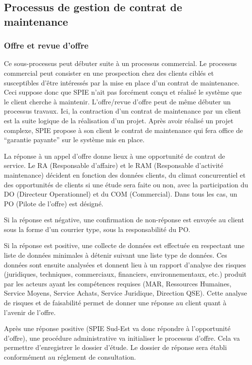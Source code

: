 \subsection{Processus de gestion de contrat de maintenance}

\subsubsection{Offre et revue d’offre}

Ce sous-processus peut débuter suite à un processus commercial. Le processus commercial peut consister en une prospection chez des clients ciblés et susceptibles d’être intéressés par la mise en place d’un contrat de maintenance. Ceci suppose donc que SPIE n’ait pas forcément conçu et réalisé le système que le client cherche à maintenir. L’offre/revue d’offre peut de même débuter un processus travaux. Ici, la contraction d’un contrat de maintenance par un client est la suite logique de la réalisation d’un projet. Après avoir réalisé un projet complexe, SPIE propose à son client le contrat de maintenance qui fera office de “garantie payante” sur le système mis en place.

La réponse à un appel d’offre donne lieux à une opportunité de contrat de service. Le RA (Responsable d’affaire) et le RAM (Responsable d’activité maintenance) décident en fonction des données clients, du climat concurrentiel et des opportunités de clients si une étude sera faite ou non, avec la participation du DO (Directeur Operationnel) et du COM (Commercial). Dans tous les cas, un PO (Pilote de l’offre) est désigné.

Si la réponse est négative, une confirmation de non-réponse est envoyée au client sous la forme d’un courrier type, sous la responsabilité du PO.

Si la réponse est positive, une collecte de données est effectuée en respectant une liste de données minimales à détenir suivant une liste type de données. Ces données sont ensuite analysées et donnent lieu à un rapport d’analyse des risques (juridiques, techniques, commerciaux, financiers, environnementaux, etc.) produit par les acteurs ayant les compétences requises (MAR, Ressources Humaines, Service Moyens, Service Achats, Service Juridique, Direction QSE). Cette analyse de risques et de faisabilité permet de donner une réponse au client quant à l'avenir de l’offre.

Après une réponse positive (SPIE Sud-Est va donc répondre à l’opportunité d’offre), une procédure administrative va initialiser le processus d'offre. Cela va permettre d'enregistrer le dossier d'étude. Le dossier de réponse sera établi conformément au réglement de consultation.


